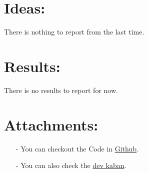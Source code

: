 \documentclass[a4paper, 11pt]{article}
\begin{document}
	\section*{Ideas:}
	There is nothing to report from the last time.
	
	\section*{Results:}
	There is no results to report for now.
	
	\section*{Attachments:}
	
	\begin{itemize}
		\item[-] You can checkout the Code in \href{https://github.com/Ethiy/3DSceneModel}{Github}.
		\item[-] You can also check the \href{https://github.com/Ethiy/3DSceneModel/projects/1}{dev kaban}.
	\end{itemize}
	
\end{document}
